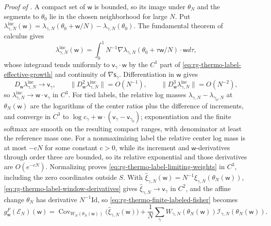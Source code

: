 \noindent\emph{Proof of .}
A compact set of $\mathsf w$ is bounded, so its image under $\theta_N$ and the segments to
$\theta_0$ lie in the chosen neighborhood for large $N$. Put
$\lambda^{\mathrm{inc}}_{\gamma,N}(\mathsf w)=\lambda_{\gamma,N}(\theta_0+\mathsf w/N)-\lambda_{\gamma,N}(\theta_0)$.
The fundamental theorem of calculus gives
\begin{equation}
\lambda^{\mathrm{inc}}_{\gamma,N}(\mathsf w)
=\int_0^1N^{-1}\nabla\lambda_{\gamma,N}(\theta_0+\tau\mathsf w/N)\cdot\mathsf w d\tau,
\label{eq:rg-thermo-label-window-increment}
\end{equation}
whose integrand tends uniformly to $\mathsf v_\gamma\cdot\mathsf w$ by the $C^1$ part of
\eqref{eq:rg-thermo-label-effective-growth} and continuity of $\nabla\mathsf s_\gamma$.
Differentiation in $\mathsf w$ gives
\begin{equation}
D_{\mathsf w}\lambda^{\mathrm{inc}}_{\gamma,N}\to\mathsf v_\gamma,
\qquad
\|D^2_{\mathsf w}\lambda^{\mathrm{inc}}_{\gamma,N}\|=O(N^{-1}),
\qquad
\|D^3_{\mathsf w}\lambda^{\mathrm{inc}}_{\gamma,N}\|=O(N^{-2}),
\label{eq:rg-thermo-label-window-derivatives}
\end{equation}
so $\lambda^{\mathrm{inc}}_{\gamma,N}\to\mathsf w\cdot\mathsf v_\gamma$ in $C^3$. For tied labels,
the relative log masses $\lambda_{\gamma,N}-\lambda_{\gamma_0,N}$ at $\theta_N(\mathsf w)$ are the
logarithms of the center ratios plus the difference of increments, and converge in $C^3$ to
$\log\mathrm c_\gamma+\mathsf w\cdot(\mathsf v_\gamma-\mathsf v_{\gamma_0})$; exponentiation and the
finite softmax are smooth on the resulting compact ranges, with denominator at least the reference
mass one. For a nonmaximizing label the relative center log mass is at most $-\mathrm cN$ for some
constant $\mathrm c>0$, while its increment and $\mathsf w$-derivatives through order three are
bounded, so its relative exponential and those derivatives are $O(e^{-\mathrm cN})$. Normalizing
proves \eqref{eq:rg-thermo-label-limiting-weights} in $C^3$, including the zero coordinates outside
$S$. With $\hat\xi_{\gamma,N}(\mathsf w)=N^{-1}\xi_{\gamma,N}(\theta_N(\mathsf w))$,
\eqref{eq:rg-thermo-label-window-derivatives} gives $\hat\xi_{\gamma,N}\to\mathsf v_\gamma$ in $C^2$,
and the affine change $\theta_N$ has derivative $N^{-1}\mathrm{Id}$, so
\eqref{eq:rg-thermo-finite-labeled-fisher} becomes
\begin{equation}
g^F_{\mathsf w}(\mathcal E_N)(\mathsf w)
=\operatorname{Cov}_{W_N(\theta_N(\mathsf w))}\bigl(\hat\xi_{\gamma,N}(\mathsf w)\bigr)
+\frac1N\sum_\gamma W_{\gamma,N}(\theta_N(\mathsf w))\mathcal I_{\gamma,N}(\theta_N(\mathsf w)).
\label{eq:rg-thermo-label-window-decomposition}
\end{equation}
